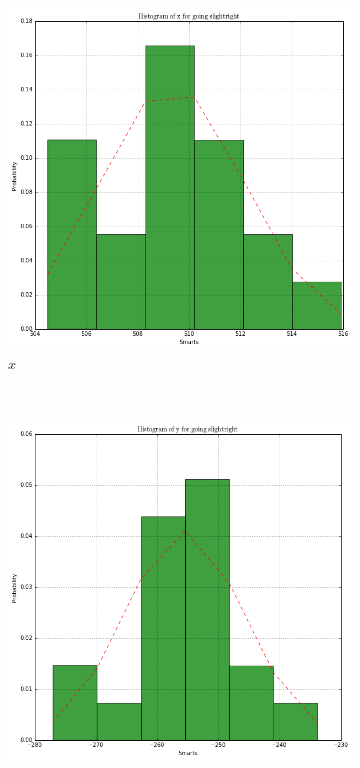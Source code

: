 \documentclass[paper=a4, fontsize=11pt]{scrartcl} %
\begin{document}
    \begin{figure}[h!]
        \centering
        \begin{subfigure}[b]{0.3\textwidth}
            \setlength{\fboxsep}{0.5pt} %
            \setlength{\fboxrule}{0.5pt}
            \includegraphics[width=\textwidth,fbox]{images/histogram_3_x_slightRight.png}
            \caption{$x$}
        \end{subfigure}
        ~
        \begin{subfigure}[b]{0.3\textwidth}
            \setlength{\fboxsep}{0.5pt} %
            \setlength{\fboxrule}{0.5pt}
            \includegraphics[width=\textwidth,fbox]{images/histogram_3_y_slightRight.png}

\end{subfigure}
\end{figure}
\end{document}
